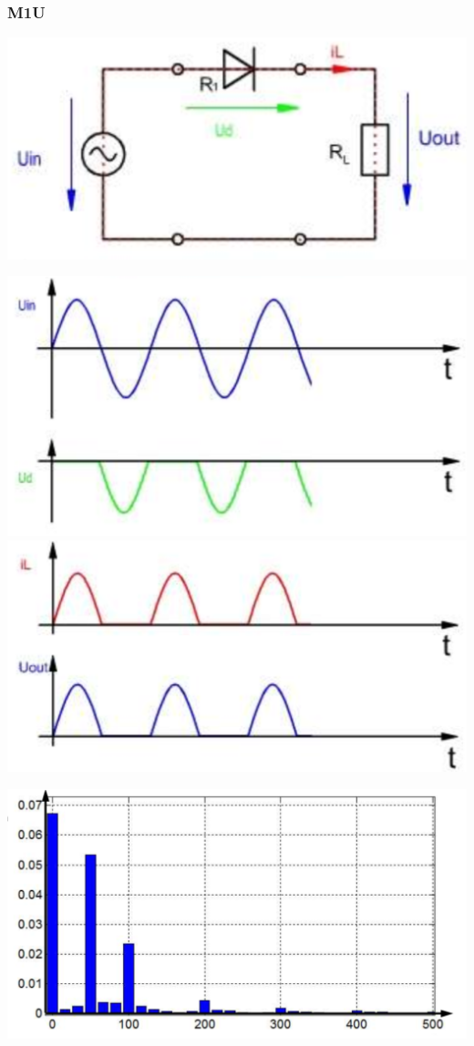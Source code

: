 \subsubsection{M1U}
\vspace{-0.5cm}
\begin{minipage}{0.4\linewidth}
    \includegraphics[width=\linewidth]{images/PrakUGM1}
\end{minipage}
\begin{minipage}{0.3\linewidth}
    \centering
   \includegraphics[width=0.7\linewidth]{images/PrakUGM1Kl1}
   \includegraphics[width=0.7\linewidth]{images/PrakUGM1Kl2}
\end{minipage}
\begin{minipage}{0.3\linewidth}
    \includegraphics[width=\linewidth]{images/UGM1OW} 
\end{minipage}
\newline

